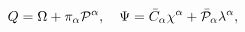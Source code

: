 \begin{equation}\label{6.10}
Q=\Omega+\pi_\alpha{\cal P}^\alpha,\quad\Psi=\bar{C}_\alpha\chi^\alpha+
\bar{\cal P}_\alpha\lambda^\alpha,
\end{equation}

